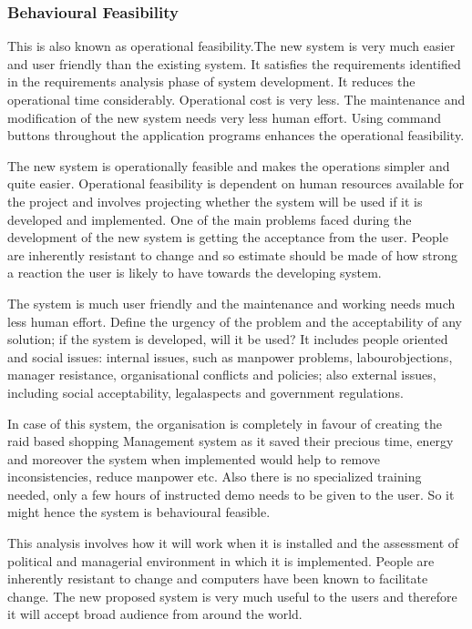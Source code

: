 \documentclass[a4paper,12pt]{article}
\begin{document}
\subsubsection{Behavioural Feasibility}\vspace{2mm}
This is also known as operational feasibility.The new system is very much easier and user friendly than the existing system. It satisfies the requirements identified in the requirements analysis phase of system development. It reduces the operational time considerably. Operational cost is very less. The maintenance and modification of the new system needs very less human effort. Using command buttons throughout the application programs enhances the operational feasibility. 
\par\vspace{2mm}The new system is operationally feasible and makes the operations simpler and quite easier. Operational feasibility is dependent on human resources available for the project and involves projecting whether the system will be used if it is developed and implemented. One of the main problems faced during the development of the new system is getting the acceptance from the user. People are inherently resistant to change and so estimate should be made of how strong a reaction the user is likely to have towards the developing system. 
\par\vspace{2mm}
The system is much user friendly and the maintenance and working needs much less human effort. Define the urgency of the problem and the acceptability of any solution; if the system is developed, will it be used? It includes people oriented and social issues: internal issues, such as manpower problems, labourobjections, manager resistance, organisational conflicts and policies; also external issues, including  social acceptability, legalaspects and government regulations.
\par\vspace{2mm}
 In case of this system, the organisation is completely in favour of creating the raid based shopping Management system as it saved their precious time, energy and moreover the system when implemented would help to remove inconsistencies, reduce manpower etc. Also there is no specialized training needed, only a few hours of instructed demo needs to be given to the user. So it might hence the system is behavioural feasible.
\par\vspace{2mm} This analysis involves how it will work when it is installed and the assessment of political and managerial environment in which it is implemented. People are inherently resistant to change and computers have been known to facilitate change. The new proposed system is very much useful to the users and therefore it will accept broad audience from around the world.
\newpage
\end{document}
